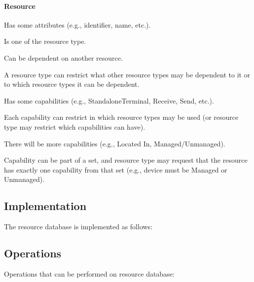 
\paragraph{Resource}
\begin{compactitem}
\item Has some attributes (e.g., identifier, name, etc.).
\item Is one of the resource type.
\item Can be dependent on another resource. 
\item A resource type can restrict what other resource types may be dependent 
  to it or to which resource types it can be dependent.
\item Has some capabilities (e.g., StandaloneTerminal, Receive, Send, etc.).
\item Each capability can restrict in which resource types may be used (or 
  resource type may restrict which capabilities can have).
\item There will be more capabilities (e.g., Located In, Managed/Unmanaged).
\item Capability can be part of a set, and resource type may request that the 
  resource has exactly one capability from that set (e.g., device must be   
  Managed or Unmanaged). 
\end{compactitem}

\subsection{Implementation}

The resource database is implemented as follows:

\vspace{2mm}


\subsection{Operations}

Operations that can be performed on resource database:

